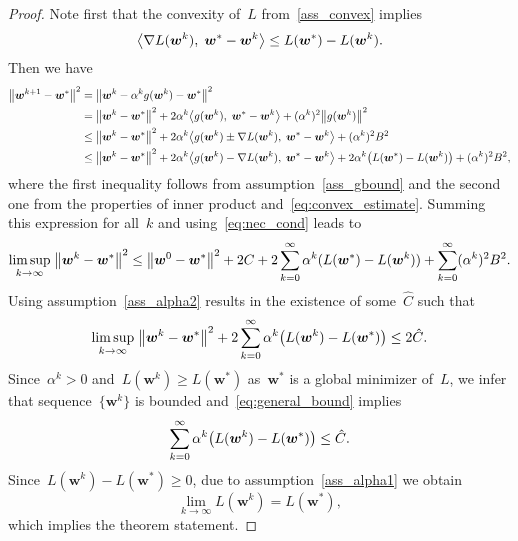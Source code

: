 \begin{proof}
  Note first that the convexity of~$L$ from~\ref{ass_convex} implies
  \begin{equation}\label{eq:convex_estimate}
    \inner{\nabla L(\bm{w}^k)}{\bm{w}^* - \bm{w}^k} \leq L(\bm{w}^*) - L(\bm{w}^k).
  \end{equation}
  Then we have
  \begin{align*}
    \norm{\bm{w}^{k+1} - \bm{w}^*}^2
      & = \norm{\bm{w}^k - \alpha^k g(\bm{w}^k) - \bm{w}^*}^2 \\
      & = \norm{\bm{w}^k - \bm{w}^*}^2 + 2\alpha^k\inner{g(\bm{w}^k)}{\bm{w}^* - \bm{w}^k} + (\alpha^k)^2 \norm{g(\bm{w}^k)}^2 \\
      & \leq \norm{\bm{w}^k - \bm{w}^*}^2 + 2\alpha^k\inner{g(\bm{w}^k) \pm \nabla L(\bm{w}^k)}{\bm{w}^* - \bm{w}^k} + (\alpha^k)^2 B^2\\
      & \leq \norm{\bm{w}^k - \bm{w}^*}^2 + 2 \alpha^k \inner{g(\bm{w}^k) - \nabla L(\bm{w}^k)}{\bm{w}^* - \bm{w}^k} + 2 \alpha^k \Brac{L(\bm{w}^*) - L(\bm{w}^k)} + (\alpha^k)^2 B^2,
  \end{align*}
  where the first inequality follows from assumption~\ref{ass_gbound} and the second one from the properties of inner product and~\eqref{eq:convex_estimate}. Summing this expression for all~$k$ and using~\eqref{eq:nec_cond} leads to
  \begin{equation*}
    \limsup_{k \rightarrow \infty} \; \norm{\bm{w}^k - \bm{w}^*}^2
      \leq \norm{\bm{w}^0 - \bm{w}^*}^2 + 2C + 2 \sum_{k=0}^\infty \alpha^k (L(\bm{w}^*) - L(\bm{w}^k)) + \sum_{k=0}^ \infty (\alpha^k)^2 B^2.
  \end{equation*}
  Using assumption~\ref{ass_alpha2} results in the existence of some~$\hat{C}$ such that
  \begin{equation}\label{eq:general_bound}
  \limsup_{k \rightarrow \infty} \;\norm{\bm{w}^k - \bm{w}^*}^2 + 2\sum_{k=0}^\infty \alpha^k \Brac{L(\bm{w}^k) - L(\bm{w}^*)} \leq 2 \hat{C}.
  \end{equation}
  Since~$\alpha^k > 0$ and~$L(\bm{w}^k) \geq L(\bm{w}^*)$ as~$\bm{w}^*$ is a global minimizer of~$L$, we infer that sequence~$\{\bm{w}^k\}$ is bounded and~\eqref{eq:general_bound} implies
  \begin{equation*}
    \sum_{k=0}^\infty \alpha^k \Brac{L(\bm{w}^k) - L(\bm{w}^*)} \leq \hat{C}.
  \end{equation*}
  Since~$L(\bm{w}^k) - L(\bm{w}^*) \geq 0$, due to assumption~\ref{ass_alpha1} we obtain
  \begin{equation*}
    \lim_{k \to \infty} L(\bm{w}^k) = L(\bm{w}^*),
  \end{equation*}
  which implies the theorem statement.
\end{proof}

